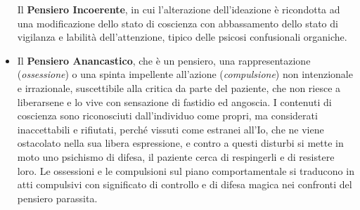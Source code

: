 \begin{itemize}
  Il \textbf{Pensiero Incoerente}, in cui l'alterazione dell'ideazione è
  ricondotta ad una modificazione dello stato di coscienza con
  abbassamento dello stato di vigilanza e labilità dell'attenzione,
  tipico delle psicosi confusionali organiche.
\item
  Il \textbf{Pensiero Anancastico}, che è un pensiero, una
  rappresentazione (\emph{ossessione}) o una spinta impellente
  all'azione (\emph{compulsione}) non intenzionale e irrazionale,
  suscettibile alla critica da parte del paziente, che non riesce a
  liberarsene e lo vive con sensazione di fastidio ed angoscia. I
  contenuti di coscienza sono riconosciuti dall'individuo come propri,
  ma considerati inaccettabili e rifiutati, perché vissuti come estranei
  all'Io, che ne viene ostacolato nella sua libera espressione, e contro
  a questi disturbi si mette in moto uno psichismo di difesa, il
  paziente cerca di respingerli e di resistere loro. Le ossessioni e le
  compulsioni sul piano comportamentale si traducono in atti compulsivi
  con significato di controllo e di difesa magica nei confronti del
  pensiero parassita.
\end{itemize}

